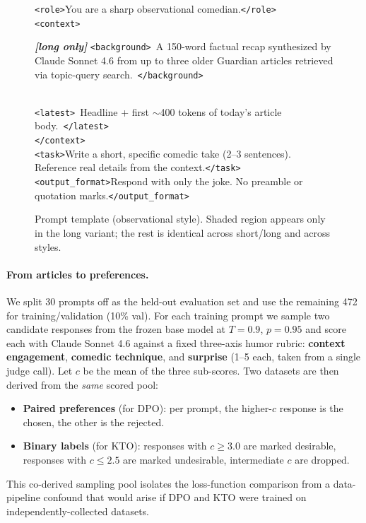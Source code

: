 \begin{figure}[t]
\centering
\small
\setlength{\fboxsep}{4pt}
\colorbox{gray!8}{\parbox{0.92\linewidth}{\small
\texttt{<role>}You are a sharp observational comedian.\texttt{</role>}\\[2pt]
\texttt{<context>}\\
\colorbox{cyan!20}{\parbox{0.84\linewidth}{\textbf{\textit{[long only]}} \texttt{<background>}~A 150-word factual recap synthesized by Claude Sonnet 4.6 from up to three older Guardian articles retrieved via topic-query search.~\texttt{</background>}}}\\
\texttt{<latest>}~Headline + first $\sim$400 tokens of today's article body.~\texttt{</latest>}\\
\texttt{</context>}\\[2pt]
\texttt{<task>}Write a short, specific comedic take (2--3 sentences). Reference real details from the context.\texttt{</task>}\\[2pt]
\texttt{<output\_format>}Respond with only the joke. No preamble or quotation marks.\texttt{</output\_format>}
}}
\caption{Prompt template (observational style).  \colorbox{cyan!20}{Shaded region} appears only in the long variant; the rest is identical across short/long and across styles.}
\label{fig:prompt}
\end{figure}

\paragraph{From articles to preferences.}
We split 30 prompts off as the held-out evaluation set and use the remaining 472 for training/validation (10\% val).  For each training prompt we sample two candidate responses from the frozen base model at $T{=}0.9$, $p{=}0.95$ and score each with Claude Sonnet 4.6 against a fixed three-axis humor rubric: \textbf{context engagement}, \textbf{comedic technique}, and \textbf{surprise} (1--5 each, taken from a single judge call).  Let $c$ be the mean of the three sub-scores.  Two datasets are then derived from the \emph{same} scored pool:
\begin{itemize}\itemsep1pt
\item \textbf{Paired preferences} (for DPO): per prompt, the higher-$c$ response is the chosen, the other is the rejected.
\item \textbf{Binary labels} (for KTO): responses with $c \geq 3.0$ are marked desirable, responses with $c \leq 2.5$ are marked undesirable, intermediate $c$ are dropped.
\end{itemize}
This co-derived sampling pool isolates the loss-function comparison from a data-pipeline confound that would arise if DPO and KTO were trained on independently-collected datasets.

